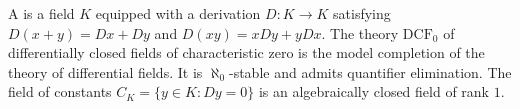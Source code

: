 A  is a field $K$ equipped with a derivation $D : K \to K$ satisfying $D(x+y) = Dx + Dy$ and $D(xy) = xDy + yDx$. The theory $\mathrm{DCF}_0$ of differentially closed fields of characteristic zero is the model completion of the theory of differential fields. It is $\aleph_0$-stable and admits quantifier elimination. The field of constants $C_K = \{y \in K : Dy = 0\}$ is an algebraically closed field of rank $1$.

